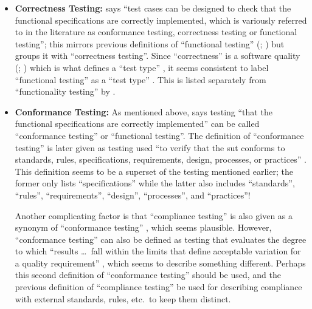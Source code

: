\begin{itemize}
      \item \textbf{Correctness Testing:} \citet[p.~5-7]{SWEBOK2024} says
            ``test cases can be designed to check that the functional
            specifications are correctly implemented, which is variously
            referred to in the literature as conformance testing, correctness
            testing or functional testing''; this mirrors previous definitions
            of ``functional testing'' (\citealp[p.~21]{IEEE2022};
            \citeyear[p.~196]{IEEE2017}) but groups it with ``correctness
            testing''. Since ``correctness'' is a software quality
            (\citealp[p.~104]{IEEE2017}; \citealp[p.~3-13]{SWEBOK2024}) which is
            what defines a ``test type'' \citep[p.~15]{IEEE2022}, it seems
            consistent to label ``functional testing'' as a ``test type''
            \citep[pp.~15,~20,~22]{IEEE2022}. This is listed separately from
            ``functionality testing'' by \citet[p.~53]{Firesmith2015}.

      \item \textbf{Conformance Testing:} As mentioned above,
            \citet[p.~5-7]{SWEBOK2024} says testing ``that the functional
            specifications are correctly implemented'' can be called
            ``conformance testing'' or ``functional testing''. The definition
            of ``conformance testing'' is later given as testing used ``to
            verify that the \acs{sut} conforms to standards, rules,
            specifications, requirements, design, processes, or practices''
            \citep[p.~5-7]{SWEBOK2024}. This definition seems to be a superset
            of the testing mentioned earlier; the former only lists
            ``specifications'' while the latter also includes ``standards'',
            ``rules'', ``requirements'', ``design'', ``processes'', and
            ``practices''!

            Another complicating factor is that ``compliance testing'' is also
            given as a synonym of ``conformance testing''
            \citep[p.~43]{Kam2008}, which seems plausible. However, ``conformance
            testing'' can also be defined as testing that evaluates the degree
            to which ``results \dots\ fall within the limits that define
            acceptable variation for a quality requirement''
            \citep[p.~93]{IEEE2017} , which seems to
            describe something different. Perhaps this second definition of
            ``conformance testing'' should be used, and the previous definition
            of ``compliance testing'' be used for describing compliance with
            external standards, rules, etc.~to keep them distinct.


\end{itemize}
